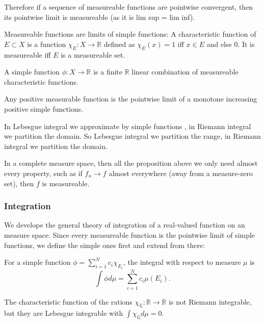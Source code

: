 \documentclass[main.tex]{subfiles}
\begin{document}
Therefore if a sequence of measureable functions are pointwise convergent, then its pointwise limit is measureable (as it is lim sup = lim inf).

Measureable functions are limits of simple functions:
A characteristic function of $E \subset X$ is a function $\chi_E: X \rightarrow \mathbb{R}$ defined as $\chi_E(x) = 1$ iff $x \in E$ and else $0$. It is measureable iff $E$ is a measureable set.

\begin{definition}
A simple function $\phi: X \rightarrow \mathbb{R}$ is a finite $\mathbb{R}$ linear combination of measureable characteristic functions.
\end{definition}


\begin{theorem}
Any positive measurable function is the pointwise limit of a monotone increasing positive simple functions. 
\end{theorem}

\begin{remark}
In Lebesgue integral we approximate by simple functions , in Riemann integral we partition the domain. So Lebesgue integral we partition the range, in Riemann integral we partition the domain.
\end{remark}

In a complete measure space, then all the proposition above we only need almost every property, such as if $f_n \rightarrow f$ almost everywhere (away from a measure-zero set), then $f$ is measureable.


\subsubsection{Integration}

We develope the general theory of integration of a real-valued function on an measure space. Since every measureable function is the pointwise limit of simple functions, we define the simple ones first and extend from there:

For a simple function $\phi = \sum_{i = 1} ^N c_i \chi_{E_i}$, the integral with respect to measure $\mu$ is 
$$
\int \phi d\mu = \sum_{i = 1} ^N c_i \mu(E_i).
$$

\begin{example}
The characteristic function of the rations $\chi_\mathbb{Q}: \mathbb{R} \rightarrow \mathbb{R}$ is not Riemann integrable, but they are Lebesgue integrable with $\int \chi_\mathbb{Q} d\mu = 0$.
\end{example}
\end{document}
